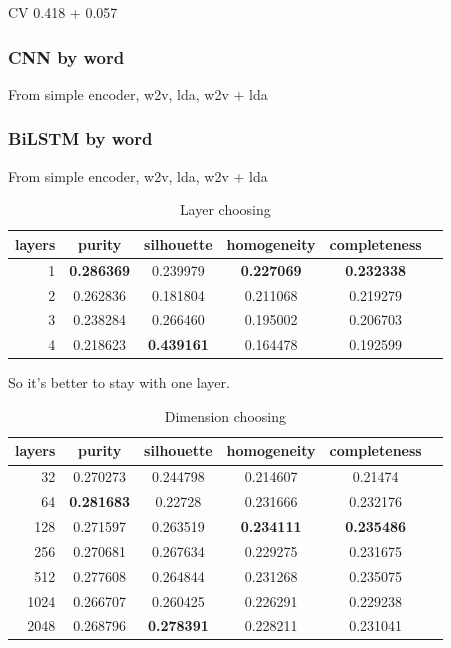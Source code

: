 \documentclass[11pt]{article}
\begin{document}
CV 0.418 + 0.057%

\subsubsection{CNN by word}

From simple encoder, w2v, lda, w2v + lda

\subsubsection{BiLSTM by word}

From simple encoder, w2v, lda, w2v + lda

\begin{table}[htb]
\begin{center}
\begin{tabular}{ |r|c|c|c|c|c| }
\hline
layers & purity  & silhouette  & homogeneity  & completeness \\ \hline 
1  & \textbf{0.286369}  & 0.239979  & \textbf{0.227069}  & \textbf{0.232338}\\ \hline 
2  & 0.262836  & 0.181804  & 0.211068  & 0.219279\\ \hline 
3  & 0.238284  & 0.266460  & 0.195002  & 0.206703\\ \hline 
4  & 0.218623  & \textbf{0.439161}  & 0.164478  & 0.192599
\end{tabular}
\end{center}
\caption{Layer choosing}
\end{table}
\FloatBarrier

So it's better to stay with one layer.

\begin{table}[htb]
\begin{center}
\begin{tabular}{ |r|c|c|c|c|c| }
\hline
layers & purity  & silhouette  & homogeneity  & completeness \\ \hline 
32  & 0.270273  & 0.244798  & 0.214607  & 0.21474\\ \hline 
64  & \textbf{0.281683}  & 0.22728  & 0.231666  & 0.232176\\ \hline 
128  & 0.271597  & 0.263519  & \textbf{0.234111}  & \textbf{0.235486}\\ \hline 
256  & 0.270681  & 0.267634  & 0.229275  & 0.231675\\ \hline 
512  & 0.277608  & 0.264844  & 0.231268  & 0.235075\\ \hline 
1024  & 0.266707  & 0.260425  & 0.226291  & 0.229238\\ \hline 
2048  & 0.268796  & \textbf{0.278391}  & 0.228211  & 0.231041 \\ \hline
\end{tabular}
\end{center}
\caption{Dimension choosing}
\end{table}
\FloatBarrier
\end{document}
